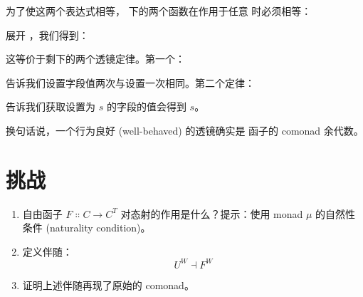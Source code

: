 为了使这两个表达式相等， 下的两个函数在作用于任意  时必须相等：

展开 ，我们得到：

这等价于剩下的两个透镜定律。第一个：

告诉我们设置字段值两次与设置一次相同。第二个定律：

告诉我们获取设置为 $s$ 的字段的值会得到 $s$。

换句话说，一个行为良好 (well-behaved) 的透镜确实是  函子的 comonad 余代数。

\section{挑战}

\begin{enumerate}
  \tightlist
  \item
        自由函子 $F \Colon C \to C^T$ 对态射的作用是什么？提示：使用 monad $\mu$ 的自然性条件 (naturality condition)。
  \item
        定义伴随：
        \[U^W \dashv F^W\]
  \item
        证明上述伴随再现了原始的 comonad。
\end{enumerate}